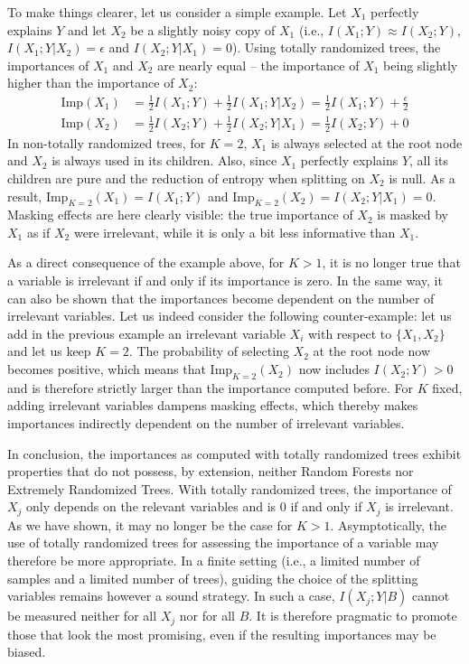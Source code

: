 To make things clearer, let us consider a simple example. Let $X_1$ perfectly explains $Y$
 and let $X_2$ be a slightly noisy copy of $X_1$ (i.e., $I(X_1;Y)
\approx I(X_2;Y)$, $I(X_1;Y|X_2)=\epsilon$ and $I(X_2;Y|X_1)=0$). Using totally
randomized trees, the importances of $X_1$ and $X_2$ are nearly equal -- the
importance of $X_1$ being slightly higher than the importance of $X_2$:
\begin{align}
\text{Imp}(X_1) &= \frac{1}{2} I(X_1;Y) + \frac{1}{2} I(X_1;Y|X_2) = \frac{1}{2} I(X_1;Y) + \frac{\epsilon}{2}\\
\text{Imp}(X_2) &= \frac{1}{2} I(X_2;Y) + \frac{1}{2} I(X_2;Y|X_1) = \frac{1}{2} I(X_2;Y) + 0
\end{align}
In non-totally randomized trees, for $K=2$, $X_1$ is always selected at the root
node and $X_2$ is always used in its children. Also, since $X_1$ perfectly
explains $Y$, all its children are pure and the reduction of entropy when
splitting on $X_2$ is null. As a result, $\text{Imp}_{K=2}(X_1) = I(X_1;Y)$ and
$\text{Imp}_{K=2}(X_2) = I(X_2;Y|X_1) = 0$. Masking effects are here
clearly visible: the true importance of $X_2$ is masked by $X_1$ as if $X_2$
were irrelevant, while it is only a bit less informative than $X_1$.

As a direct consequence of the example above, for $K>1$, it is no longer true
that a variable is irrelevant if and only if its importance is zero. In the same
way, it can also be shown that the importances become dependent on the number of
irrelevant variables. Let us indeed consider the following counter-example: let
us add in the previous example an irrelevant variable $X_i$ with respect to
$\{X_1, X_2\}$ and let us keep $K=2$. The probability of selecting $X_2$ at the
root node now becomes positive, which means that $\text{Imp}_{K=2}(X_2)$ now includes
$I(X_2;Y)>0$ and is therefore strictly larger than the importance computed
before. For $K$ fixed, adding irrelevant variables dampens masking effects,
which thereby makes importances indirectly dependent on the number of irrelevant
variables.

In conclusion, the importances as computed with totally randomized trees
exhibit properties that do not possess, by extension, neither Random Forests nor
Extremely Randomized Trees. With totally randomized trees, the importance of
$X_j$ only depends on the relevant variables and is $0$ if and only if $X_j$ is
irrelevant. As we have shown, it may no longer be the case for $K>1$.
Asymptotically, the use of totally randomized trees for assessing the importance of
a variable may therefore be more appropriate. In a finite setting (i.e., a
limited number of samples and a limited number of trees), guiding the choice of
the splitting variables remains however a sound strategy. In such a case,
$I(X_j;Y|B)$ cannot be measured neither for all $X_j$ nor for all $B$. It is
therefore  pragmatic to promote those that look the most promising, even if
the resulting importances may be biased.

